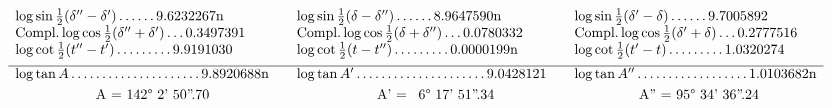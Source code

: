 \documentclass[10pt,a4paper]{article}
\begin{document}
\[
\begin{array}{l@{\hspace{2em}}l@{\hspace{2em}}l}
\log\sin\tfrac{1}{2}(\delta'' - \delta') \ldots\ldots 9.6232267\text{n} & \log\sin\tfrac{1}{2}(\delta - \delta'') \ldots\ldots 8.9647590\text{n} & \log\sin\tfrac{1}{2}(\delta' - \delta) \ldots\ldots 9.7005892 \\
\text{Compl.}\log\cos\tfrac{1}{2}(\delta'' + \delta') \ldots 0.3497391 & \text{Compl.}\log\cos\tfrac{1}{2}(\delta + \delta'') \ldots 0.0780332 & \text{Compl.}\log\cos\tfrac{1}{2}(\delta' + \delta) \ldots 0.2777516 \\
\log\cot\tfrac{1}{2}(t'' - t') \ldots\ldots\ldots 9.9191030 & \log\cot\tfrac{1}{2}(t - t'') \ldots\ldots\ldots 0.0000199\text{n} & \log\cot\tfrac{1}{2}(t' - t) \ldots\ldots\ldots 1.0320274 \\[0.5em]
\hline
\log\tan A \ldots\ldots\ldots\ldots\ldots\ldots\ldots 9.8920688\text{n} & \log\tan A' \ldots\ldots\ldots\ldots\ldots\ldots\ldots 9.0428121 & \log\tan A'' \ldots\ldots\ldots\ldots\ldots\ldots 1.0103682\text{n} \\[0.3em]
\multicolumn{1}{c}{$A = 142°\ 2'\ 50''.70$} & \multicolumn{1}{c}{$A' = \phantom{1}6°\ 17'\ 51''.34$} & \multicolumn{1}{c}{$A'' = 95°\ 34'\ 36''.24$}
\end{array}
\]
\end{document}
